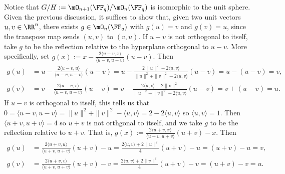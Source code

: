 Notice that $G/H := \mO_{n+1}(\FF_q)/\mO_n(\FF_q)$ is isomorphic to the unit sphere.
Given the previous discussion, it suffices to show that, given two unit vectors $u,v\in\RR^n$, there exists $g\in\mO_n(\FF_q)$ with $g(u) = v$ and $g(v) = u$, since the transpose map sends $(u,v)$ to $(v,u)$.
If $u-v$ is not orthogonal to itself, take $g$ to be the reflection relative to the hyperplane orthogonal to $u-v$.
More specifically, set $g(x) := x - \frac{2\langle u-v,x\rangle}{\langle u-v,u-v\rangle}(u-v)$.
Then
\begin{align*}
	g(u) & = u - \frac{2\langle u-v,u\rangle}{\langle u-v,u-v\rangle}(u-v) = u - \frac{2\|u\|^2-2\langle u,v\rangle}{\|u\|^2+\|v\|^2-2\langle u,v\rangle}(u-v) = u - (u-v) = v, \\
	g(v) & = v - \frac{2\langle u-v,v\rangle}{\langle u-v,u-v\rangle}(u-v) = v - \frac{2\langle u,v\rangle-2\|v\|^2}{\|u\|^2+\|v\|^2-2\langle u,v\rangle}(u-v) = v + (u-v) = u.
\end{align*}
If $u-v$ is orthogonal to itself, this tells us that $0=\langle u-v,u-v\rangle = \|u\|^2+\|v\|^2-\langle u,v\rangle = 2-2\langle u,v\rangle$ so $\langle u,v\rangle = 1$.
Then $\langle u+v,u+v\rangle = 4$ so $u+v$ is not orthgonal to itself, and we take $g$ to be the reflection relative to $u+v$.
That is, $g(x) := \frac{2\langle u+v,x\rangle}{\langle u+v,u+v\rangle}(u+v) - x$.
Then
\begin{align*}
	g(u) & = \frac{2\langle u+v,u\rangle}{\langle u+v,u+v\rangle}(u+v) - u = \frac{2\langle u,v\rangle + 2\|u\|^2}{4}(u+v)-u = (u+v)-u = v, \\
	g(v) & = \frac{2\langle u+v,v\rangle}{\langle u+v,u+v\rangle}(u+v) - v = \frac{2\langle u,v\rangle + 2\|v\|^2}{4}(u+v)-v = (u+v)-v = u.
\end{align*}

